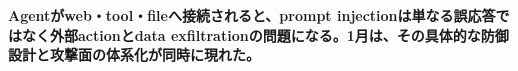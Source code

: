 \noindent\textbf{Agentがweb・tool・fileへ接続されると、prompt injectionは単なる誤応答ではなく外部actionとdata exfiltrationの問題になる。1月は、その具体的な防御設計と攻撃面の体系化が同時に現れた。}\autocite{src-0d2abbb0fa62,src-e9010a7fe30b}
